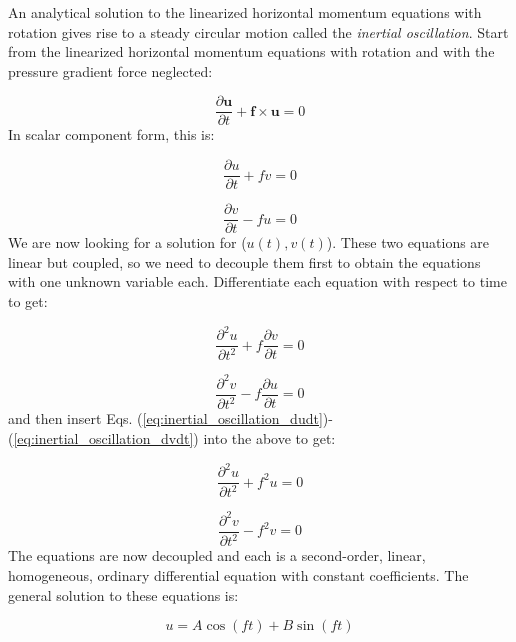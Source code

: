 \documentclass[12pt]{article}
\numberwithin{equation}{section}
\numberwithin{figure}{section}
\numberwithin{table}{section}
\begin{document}
An analytical solution to the linearized horizontal momentum equations with
rotation gives rise to a steady circular motion called the \textit{inertial
oscillation}.
Start from the linearized horizontal momentum equations with rotation
and with the pressure gradient force neglected:

\begin{equation}
  \frac{\partial \mathbf{u}}{\partial t} + \mathbf{f} \times \mathbf{u} = 0
\end{equation}
In scalar component form, this is:

\begin{equation}
  \frac{\partial u}{\partial t} + f v = 0
  \label{eq:inertial_oscillation_dudt}
\end{equation}

\begin{equation}
  \frac{\partial v}{\partial t} - f u = 0
  \label{eq:inertial_oscillation_dvdt}
\end{equation}
We are now looking for a solution for ($u(t), v(t)$).
These two equations are linear but coupled, so we need to decouple them
first to obtain the equations with one unknown variable each.
Differentiate each equation with respect to time to get:

\begin{equation}
  \frac{\partial^2 u}{\partial t^2} + f \frac{\partial v}{\partial t} = 0
\end{equation}

\begin{equation}
  \frac{\partial^2 v}{\partial t^2} - f \frac{\partial u}{\partial t} = 0
\end{equation}
and then insert Eqs. (\ref{eq:inertial_oscillation_dudt})-(\ref{eq:inertial_oscillation_dvdt})
into the above to get:

\begin{equation}
  \frac{\partial^2 u}{\partial t^2} + f^2 u = 0
\end{equation}

\begin{equation}
  \frac{\partial^2 v}{\partial t^2} - f^2 v = 0
\end{equation}
The equations are now decoupled and each is a second-order, linear, homogeneous,
ordinary differential equation with constant coefficients.
The general solution to these equations is:

\begin{equation}
  u = A \cos(f t) + B \sin(f t)
\end{equation}
\end{document}

